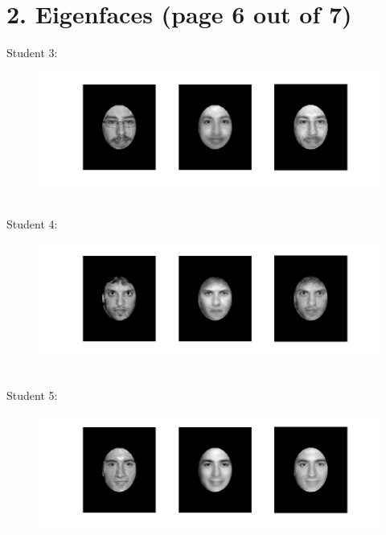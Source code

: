 \documentclass[11pt]{article}
\begin{document}
\section*{2. Eigenfaces (page 6 out of 7)}
Student 3:
\begin{figure}[ht!]
\centering
\includegraphics[width=180mm]{images/student3.png}
\label{overflow}
\end{figure} \\
Student 4:
\begin{figure}[ht!]
\centering
\includegraphics[width=180mm]{images/student4.png}
\label{overflow}
\end{figure} \\
Student 5:
\begin{figure}[ht!]
\centering
\includegraphics[width=180mm]{images/student5.png}
\label{overflow}
\end{figure}
\newpage
\end{document}
